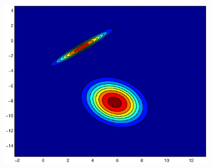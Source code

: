 \documentclass[useAMS,usenatbib,fleqn]{mn2e}
\begin{document}
\begin{figure}
\begin{subfigure}[b]{0.3\columnwidth}
                \includegraphics[width=\textwidth]{figures/VC2.eps}
        \end{subfigure}
       

\end{figure}
\end{document}
